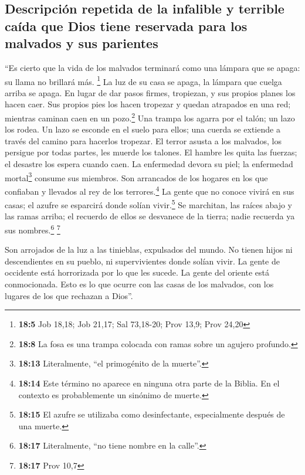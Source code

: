 \hypertarget{descripciuxf3n-repetida-de-la-infalible-y-terrible-cauxedda-que-dios-tiene-reservada-para-los-malvados-y-sus-parientes}{%
\subsection{Descripción repetida de la infalible y terrible caída que
Dios tiene reservada para los malvados y sus
parientes}\label{descripciuxf3n-repetida-de-la-infalible-y-terrible-cauxedda-que-dios-tiene-reservada-para-los-malvados-y-sus-parientes}}

 ``Es cierto que la vida de los malvados terminará como
una lámpara que se apaga: su llama no brillará más. \footnote{\textbf{18:5}
  Job 18,18; Job 21,17; Sal 73,18-20; Prov 13,9; Prov 24,20}
 La luz de su casa se apaga, la lámpara que cuelga arriba
se apaga.  En lugar de dar pasos firmes, tropiezan, y sus
propios planes los hacen caer.  Sus propios pies los hacen
tropezar y quedan atrapados en una red; mientras caminan caen en un
pozo.\footnote{\textbf{18:8} La fosa es una trampa colocada con ramas
  sobre un agujero profundo.}  Una trampa los agarra por
el talón; un lazo los rodea.  Un lazo se esconde en el
suelo para ellos; una cuerda se extiende a través del camino para
hacerlos tropezar.  El terror asusta a los malvados, los
persigue por todas partes, les muerde los talones.  El
hambre les quita las fuerzas; el desastre los espera cuando caen.
 La enfermedad devora su piel; la enfermedad
mortal\footnote{\textbf{18:13} Literalmente, ``el primogénito de la
  muerte''.} consume sus miembros.  Son arrancados de los
hogares en los que confiaban y llevados al rey de los
terrores.\footnote{\textbf{18:14} Este término no aparece en ninguna
  otra parte de la Biblia. En el contexto es probablemente un sinónimo
  de muerte.}  La gente que no conoce vivirá en sus
casas; el azufre se esparcirá donde solían vivir.\footnote{\textbf{18:15}
  El azufre se utilizaba como desinfectante, especialmente después de
  una muerte.}  Se marchitan, las raíces abajo y las
ramas arriba;  el recuerdo de ellos se desvanece de la
tierra; nadie recuerda ya sus nombres.\footnote{\textbf{18:17}
  Literalmente, ``no tiene nombre en la calle''.} \footnote{\textbf{18:17}
  Prov 10,7}

 Son arrojados de la luz a las tinieblas, expulsados del
mundo.  No tienen hijos ni descendientes en su pueblo, ni
supervivientes donde solían vivir.  La gente de occidente
está horrorizada por lo que les sucede. La gente del oriente está
conmocionada.  Esto es lo que ocurre con las casas de los
malvados, con los lugares de los que rechazan a Dios''.

